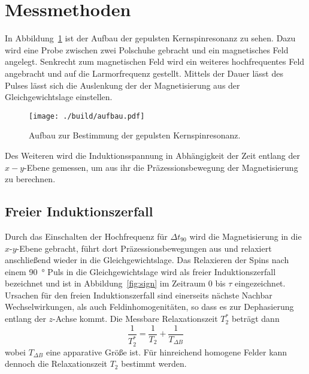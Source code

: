 \section{Messmethoden}%
\label{sec:messmethoden}
In Abbildung~\ref{fig:aufbau} ist der Aufbau der gepulsten Kernspinresonanz zu
sehen. 
Dazu wird eine Probe zwischen zwei Polschuhe gebracht und ein magnetisches Feld
angelegt.
Senkrecht zum magnetischen Feld wird ein weiteres hochfrequentes Feld angebracht
und auf die Larmorfrequenz gestellt. 
Mittels der Dauer lässt des Pulses lässt sich die Auslenkung der
der Magnetisierung aus der Gleichgewichtslage einstellen. 
\begin{figure}[ht]
		\centering
		\texttt{[image: ./build/aufbau.pdf]}
		\caption{Aufbau zur Bestimmung der gepulsten Kernspinresonanz.}%
		\label{fig:aufbau}
\end{figure}
Des Weiteren wird die Induktionsspannung in Abhängigkeit der Zeit entlang der $x-y$-Ebene gemessen,
um aus ihr die Präzessionsbewegung der Magnetisierung zu berechnen.

\subsection{Freier Induktionszerfall}%
\label{sub:freie_induktionszerfall}
Durch das Einschalten der Hochfrequenz für $\Delta t_{90}$ wird die
Magnetisierung in die $x$-$y$-Ebene gebracht, führt dort Präzessionsbewegungen aus und 
relaxiert anschließend wieder in die Gleichgewichtslage. 
Das Relaxieren der Spins nach einem \SI{90}{\degree} Puls in die
Gleichgewichtslage wird als freier Induktionszerfall bezeichnet und ist in
Abbildung~\ref{fig:sign} im Zeitraum 0 bis $\tau$ eingezeichnet.
Ursachen für den freien Induktionszerfall sind einerseits nächste Nachbar
Wechselwirkungen, als auch Feldinhomogenitäten, so dass es zur Dephasierung
entlang der $z$-Achse kommt.
Die Messbare Relaxationszeit $T_2^*$ beträgt dann
\begin{equation}
		\frac{1}{T_2^*} = \frac{1}{T_2} + \frac{1}{T_{\Delta B}}
\end{equation}
wobei $T_{\Delta B}$ eine apparative Größe ist. 
Für hinreichend homogene Felder kann dennoch die Relaxationszeit $T_2$ 
bestimmt werden. 
